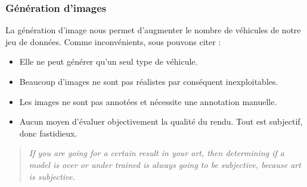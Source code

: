 \subsubsection{Génération d'images}

La génération d'image nous permet d'augmenter le nombre de véhicules de notre jeu de données.
Comme inconvénients, sous pouvons citer :

\begin{itemize}
    \item Elle ne peut générer qu'un seul type de véhicule.
    \item Beaucoup d'images ne sont pas réalistes par conséquent inexploitables.
    \item Les images ne sont pas annotées et nécessite une annotation manuelle.
    \item Aucun moyen d'évaluer objectivement la qualité du rendu. Tout est subjectif, donc fastidieux.
\end{itemize}

\begin{quote}
    \textit{If you are going for a certain result in your art, then determining if a model is over or under trained is always going to be subjective, because art is subjective.\cite{reddit_proverbe}}
\end{quote}


